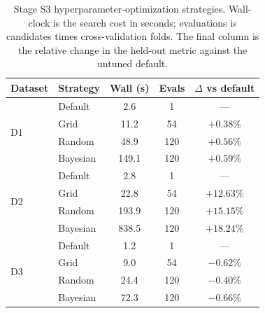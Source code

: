 \documentclass{ieeeaccess}
\begin{document}
\begin{table}[t]
\caption{Stage S3 hyperparameter-optimization strategies. Wall-clock is the search cost in seconds; evaluations is candidates times cross-validation folds. The final column is the relative change in the held-out metric against the untuned default.}
\label{tab:tuning}
\centering
\footnotesize
\setlength{\tabcolsep}{3pt}
\begin{tabular}{llccc}
\toprule
Dataset & Strategy & Wall (s) & Evals & $\Delta$ vs default \\
\midrule
\multirow{4}{*}{D1} & Default & 2.6 & 1 & --- \\
 & Grid & 11.2 & 54 & $+0.38\%$ \\
 & Random & 48.9 & 120 & $+0.56\%$ \\
 & Bayesian & 149.1 & 120 & $+0.59\%$ \\
\midrule
\multirow{4}{*}{D2} & Default & 2.8 & 1 & --- \\
 & Grid & 22.8 & 54 & $+12.63\%$ \\
 & Random & 193.9 & 120 & $+15.15\%$ \\
 & Bayesian & 838.5 & 120 & $+18.24\%$ \\
\midrule
\multirow{4}{*}{D3} & Default & 1.2 & 1 & --- \\
 & Grid & 9.0 & 54 & $-0.62\%$ \\
 & Random & 24.4 & 120 & $-0.40\%$ \\
 & Bayesian & 72.3 & 120 & $-0.66\%$ \\
\bottomrule
\end{tabular}
\end{table}
\end{document}
